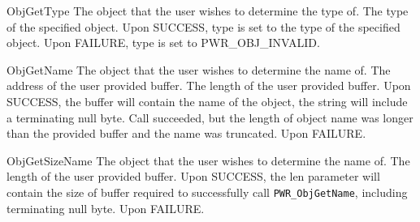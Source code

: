 \begin{prototype}{ObjGetType}
		{\pInput}	{The object that the user wishes to determine the type of.}
		{\pOutput}	{The type of the specified object.}
	 	{ Upon SUCCESS, type is set to the type of the specified object.}
	 	{ Upon FAILURE, type is set to PWR_OBJ_INVALID.}
\end{prototype}
\begin{prototype}{ObjGetName}
		{\pInput}	{The object that the user wishes to determine the name of.}
	    	{\pInput}	{The address of the user provided buffer.}
	    	{\pInput}	{The length of the user provided buffer.}
	 	{Upon SUCCESS, the buffer will contain the name of the object, the string will include a terminating null byte.}	
	 	{Call succeeded, but the length of object name was longer than the provided buffer and the name was truncated.}
	 	{Upon FAILURE.}
\end{prototype}
\begin{prototype}{ObjGetSizeName}
      {\pInput}   {The object that the user wishes to determine the name of.}
         {\pInputOutput} {The length of the user provided buffer.}
         {Upon SUCCESS, the len parameter will contain the size of buffer required to successfully call \texttt{PWR_ObjGetName}, including terminating null byte.}
         {Upon FAILURE.}
\end{prototype}

